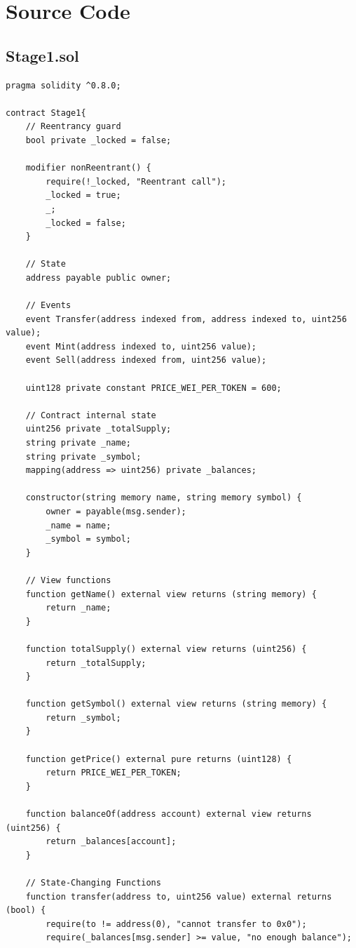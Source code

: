 \documentclass[10pt,a4paper]{article}
\begin{document}
\newpage
\section{Source Code}

\subsection*{Stage1.sol}

\begin{lstlisting}
pragma solidity ^0.8.0;

contract Stage1{
    // Reentrancy guard
    bool private _locked = false;
    
    modifier nonReentrant() {
        require(!_locked, "Reentrant call");
        _locked = true;
        _;
        _locked = false;
    }
    
    // State 
    address payable public owner;
    
    // Events
    event Transfer(address indexed from, address indexed to, uint256 value);
    event Mint(address indexed to, uint256 value);
    event Sell(address indexed from, uint256 value);

    uint128 private constant PRICE_WEI_PER_TOKEN = 600;

    // Contract internal state
    uint256 private _totalSupply;
    string private _name;
    string private _symbol;
    mapping(address => uint256) private _balances;

    constructor(string memory name, string memory symbol) {
        owner = payable(msg.sender);
        _name = name;
        _symbol = symbol;
    }

    // View functions
    function getName() external view returns (string memory) {
        return _name;
    }

    function totalSupply() external view returns (uint256) {
        return _totalSupply;
    }

    function getSymbol() external view returns (string memory) {
        return _symbol;
    }

    function getPrice() external pure returns (uint128) {
        return PRICE_WEI_PER_TOKEN;
    }

    function balanceOf(address account) external view returns (uint256) {
        return _balances[account];
    }

    // State-Changing Functions
    function transfer(address to, uint256 value) external returns (bool) {
        require(to != address(0), "cannot transfer to 0x0");
        require(_balances[msg.sender] >= value, "no enough balance");


\end{lstlisting}
\end{document}
